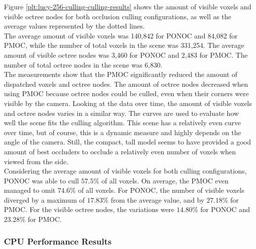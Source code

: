 
\noindent
Figure \ref{plt:lucy-256-culling-culling-results} shows the amount of visible voxels and visible octree 
nodes for both occlusion culling configurations, as well as the average values represented by the dotted 
lines. \\

\noindent
The average amount of visible voxels was 140,842 for \ac{PONOC} and 84,082 for \ac{PMOC}, 
while the number of total voxels in the scene was 331,254. The average amount of visible 
octree nodes was 3,460 for \ac{PONOC} and 2,483 for \ac{PMOC}. The number of total octree 
nodes in the scene was 6,830. \\

\noindent
The measurements show that the \ac{PMOC} significantly reduced the amount of dispatched voxels and octree nodes. 
The amount of octree nodes decreased when using \ac{PMOC} because octree nodes could be culled, even when their 
corners were visible by the camera. Looking at the data over time, the amount of visible voxels and octree nodes
varies in a similar way. The curves are used to evaluate how well the scene fits the culling algorithm. This 
scene has a relatively even curve over time, but of course, this is a dynamic measure and highly depends on the 
angle of the camera. Still, the compact, tall model seems to have provided a good amount of best occluders to 
occlude a relatively even number of voxels when viewed from the side. \\

\noindent
Considering the average amount of visible voxels for both culling configurations, \ac{PONOC} was able to cull 
$57.5\%$ of all voxels. On average, the \ac{PMOC} even managed to omit $74.6\%$ of all voxels. For \ac{PONOC},
the number of visible voxels diverged by a maximum of $17.83\%$ from the average value, and by $27.18\%$ for \ac{PMOC}. 
For the visible octree nodes, the variations were $14.80\%$ for \ac{PONOC} and $23.28\%$ for \ac{PMOC}.

\subsubsection*{CPU Performance Results} \label{subsubsec-cpu-performance-results-lucy}

